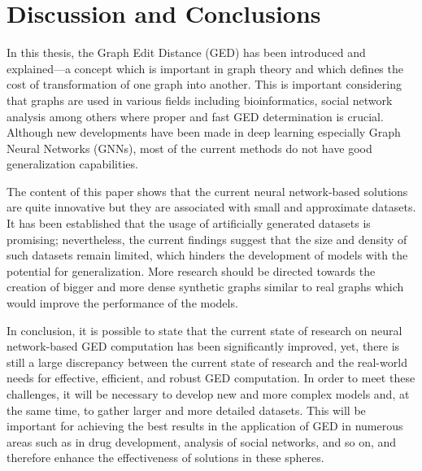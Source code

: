 \documentclass[../Thesis.tex]{subfiles}
\begin{document}
	\section{Discussion and Conclusions}
	\label{sec:discussion_and_conclusions}
	In this thesis, the Graph Edit Distance (GED) has been introduced and explained—a concept which is important in graph theory and which defines the cost of transformation of one graph into another. This is important considering that graphs are used in various fields including bioinformatics, social network analysis among others where proper and fast GED determination is crucial. Although new developments have been made in deep learning especially Graph Neural Networks (GNNs), most of the current methods do not have good generalization capabilities.
	
	The content of this paper shows that the current neural network-based solutions are quite innovative but they are associated with small and approximate datasets. It has been established that the usage of artificially generated datasets is promising; nevertheless, the current findings suggest that the size and density of such datasets remain limited, which hinders the development of models with the potential for generalization. More research should be directed towards the creation of bigger and more dense synthetic graphs similar to real graphs which would improve the performance of the models.
	
	In conclusion, it is possible to state that the current state of research on neural network-based GED computation has been significantly improved, yet, there is still a large discrepancy between the current state of research and the real-world needs for effective, efficient, and robust GED computation. In order to meet these challenges, it will be necessary to develop new and more complex models and, at the same time, to gather larger and more detailed datasets. This will be important for achieving the best results in the application of GED in numerous areas such as in drug development, analysis of social networks, and so on, and therefore enhance the effectiveness of solutions in these spheres.
\end{document}

